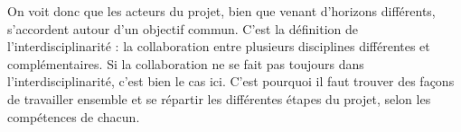 On voit donc que les acteurs du projet, bien que venant d’horizons différents, s’accordent autour d’un objectif commun. C’est la définition de l’interdisciplinarité : la collaboration entre plusieurs disciplines différentes et complémentaires. Si la collaboration ne se fait pas toujours dans l’interdisciplinarité, c’est bien le cas ici. C’est pourquoi il faut trouver des façons de travailler ensemble et se répartir les différentes étapes du projet, selon les compétences de chacun. 